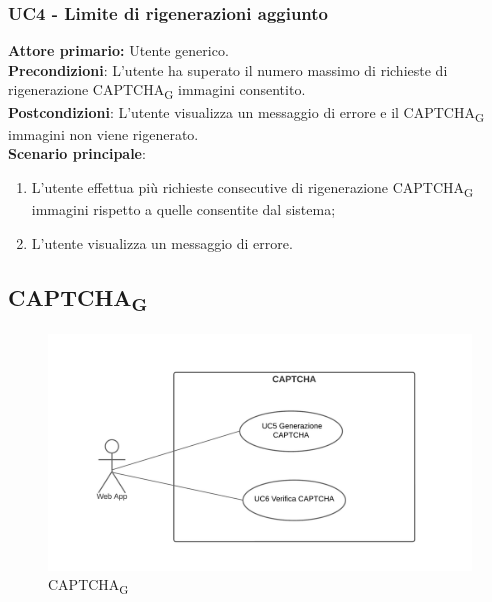 \subsubsection{UC4 - Limite di rigenerazioni aggiunto}
\textbf{Attore primario:} Utente generico.\\
\textbf{Precondizioni}: L'utente ha superato il numero massimo di richieste di rigenerazione CAPTCHA\textsubscript{G} immagini consentito.\\
\textbf{Postcondizioni}: L’utente visualizza un messaggio di errore e il CAPTCHA\textsubscript{G} immagini non viene rigenerato.\\

\textbf{Scenario principale}:
\begin{enumerate}
    \item L'utente effettua più richieste consecutive di rigenerazione CAPTCHA\textsubscript{G} immagini rispetto a quelle consentite dal sistema;
	\item L’utente visualizza un messaggio di errore.
\end{enumerate}

\subsection{CAPTCHA\textsubscript{G}}

\begin{figure}[H]
    \centering
    \includegraphics[scale=0.6]{img/captcha.png}
    \caption{CAPTCHA\textsubscript{G}}
\end{figure}

